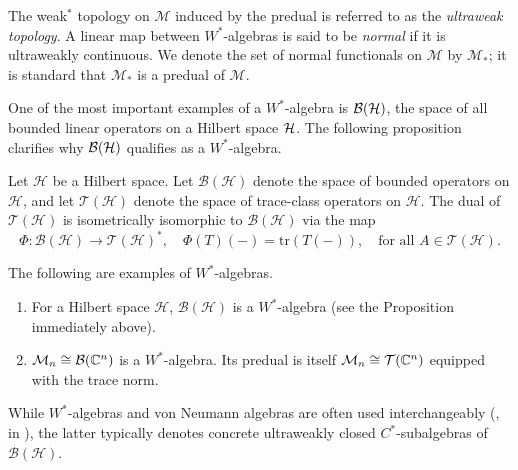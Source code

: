 \begin{definition}
  The weak\(^*\) topology on \(  \mathscr{M} \) induced by the predual is referred to as the \emph{ultraweak topology}. A linear map between \( W^* \)-algebras 
is said to be \emph{normal} if it is ultraweakly continuous.
We denote the set of normal functionals on \(  \mathscr{M} \) by \(  \mathscr{M}_* \); it is standard that \(  \mathscr{M}_* \) is a predual of \(  \mathscr{M} \).
\end{definition}

One of the most important examples of a $W^*$-algebra is $\mathcal{B}(\mathcal{H})$, the space of all bounded linear operators on a Hilbert space $\mathcal{H}$. The following proposition clarifies why \( \mathcal{B}(\mathcal{H}) \) qualifies as a \( W^* \)-algebra.

\begin{proposition} \cite[Theorem 19.2]{conwayCourseOperatorTheory2000}
  Let \(\mathcal{H}\) be a Hilbert space. Let \(\mathcal{B}(\mathcal{H}) \) denote the space of bounded operators on \(\mathcal{H}\), and let \(\mathcal{T}(\mathcal{H})\) denote the space of trace-class operators on \(\mathcal{H}\).
    The dual of \(\mathcal{T}(\mathcal{H})\) is isometrically isomorphic to \(\mathcal{B}(\mathcal{H})\) via the map
    \[
    \Phi : \mathcal{B}(\mathcal{H}) \to \mathcal{T}(\mathcal{H})^*, \quad \Phi(T)(-) = \mathrm{tr}(T(-)), \quad \text{for all } A \in \mathcal{T}(\mathcal{H}).
    \]
\end{proposition}

\begin{example}
   The following are examples of $W^*$-algebras.
  \begin{enumerate}
    \item For a Hilbert space $\mathcal{H}$, $\mathcal{B}(\mathcal{H})$ is a $W^*$-algebra (see the Proposition immediately above).
    \item  $\mathcal{M}_{n} \cong \mathcal{B}(\mathbb{C}^n)$ is a $W^*$-algebra. Its predual is itself $\mathcal{M}_{n} \cong \mathcal{T}(\mathbb{C}^n)$ equipped with the trace norm.
  \end{enumerate}
\end{example}

\begin{remark}
  While $W^*$-algebras and von Neumann algebras are often used interchangeably (\eg, in \cite{westerbaanCategoryNeumannAlgebras2019}), the latter typically denotes concrete ultraweakly closed $C^*$-subalgebras of $\mathcal{B}(\mathcal{H})$.
\end{remark}

